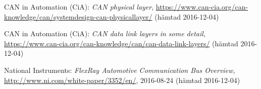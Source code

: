 \documentclass[a4paper]{IEEEtran}
\begin{document}
\begin{thebibliography}{77}
	CAN in Automation (CiA): \emph{CAN physical layer},
	\url{https://www.can-cia.org/can-knowledge/can/systemdesign-can-physicallayer/}
	(hämtad 2016-12-04)
	
	CAN in Automation (CiA): \emph{CAN data link layers in some detail},
	\url{https://www.can-cia.org/can-knowledge/can/can-data-link-layers/}
	(hämtad 2016-12-04)
	
	National Instruments: \emph{FlexRay Automotive Communication Bus Overview},
	\url{http://www.ni.com/white-paper/3352/en/},
	2016-08-24 (hämtad 2016-12-04)
	
\end{thebibliography}
\end{document}
